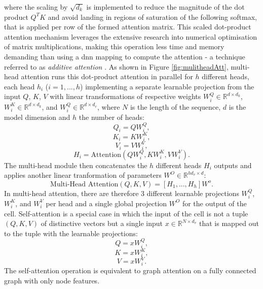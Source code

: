 where the scaling by $\sqrt{d_k}$ is implemented to reduce the magnitude of the dot product $Q^T K$ and avoid landing in regions of saturation of the following softmax, that is applied per row of the formed attention matrix. This scaled dot-product attention mechanism leverages the extensive research into numerical optimisation of matrix multiplications, making this operation less time and memory demanding than using a \gls{dnn} mapping to compute the attention - a technique referred to as \textit{additive attention} \cite{Bahdanau2014NeuralMT}. As shown in Figure \ref{fig:mulitheadAtt}, multi-head attention runs this dot-product attention in parallel for $h$ different heads, each head $h_i$ ($i = 1, ..., h$) implementing a separate learnable projection from the input $Q$, $K$, $V$ with linear transformations of respective weights $W_i^Q \in \mathbb{R}^{d \times d_k}$, $W_i^K \in \mathbb{R}^{d \times d_k}$, and $W_i^Q \in \mathbb{R}^{d \times d_v}$, where $N$ is the length of the sequence, $d$ is the model dimension and $h$ the number of heads: \[Q_i = Q W_i^Q,\] \[K_i = K W_i^K,\] \[V_i = V W_i^V,\] \[H_i = \text{Attention}(QW_i^Q, KW_i^K, VW_i^V).\] The multi-head module then concatenates the $h$ different heads $H_i$ outputs and applies another linear tranformation of parameters $W^O \in \mathbb{R}^{hd_v \times d}$: \[\text{Multi-Head Attention}(Q, K, V) = \left[H_1, ..., H_h\right]W^o .\] In multi-head attention, there are therefore 3 different learnable projections $W_i^Q$, $W_i^K$, and $W_i^V$ per head and a single global projection $W^O$ for the output of the cell. Self-attention is a special case in which the input of the cell is not a tuple $(Q, K, V)$ of distinctive vectors but a single input $x \in \mathbb{R}^{N \times d_v}$ that is mapped out to the tuple with the learnable projections: \[Q = xW_i^Q,\] \[K = xW_i^K,\] \[V = xW_i^V.\]
The self-attention operation is equivalent to graph attention on a fully connected graph with only node features. 


